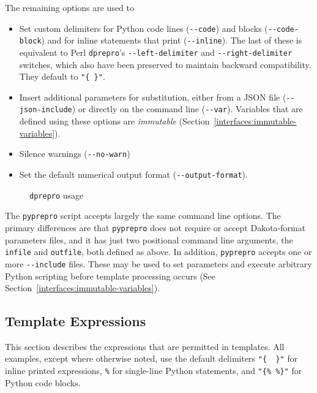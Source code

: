 {The remaining options are used to
\begin{itemize}
  \item Set custom delimiters for Python code lines (\texttt{-\/-code}) and blocks 
    (\texttt{-\/-code-block}) and for inline statements that print 
    (\texttt{-\/-inline}). The last of these is equivalent to Perl \texttt{dprepro}'s 
    \texttt{-\/-left-delimiter} and \texttt{-\/-right-delimiter} switches, which also
    have been preserved to maintain backward compatibility. They default to 
    \texttt{"\{ \}"}.
  \item Insert additional parameters for substitution, either from a JSON file
   (\texttt{-\/-json-include}) or directly on the command line (\texttt{-\/-var}).
   Variables that are defined using these options are \emph{immutable}
   (Section~\ref{interfaces:immutable-variables}).
  \item Silence warnings (\texttt{-\/-no-warn})
  \item Set the default numerical output format (\texttt{-\/-output-format}).
\end{itemize}

\begin{figure}
  \centering
  \begin{bigbox}
    \begin{tiny}
    \end{tiny}
  \end{bigbox}
  \caption{\texttt{dprepro} usage}
  \label{advint:dprepro_usage}
\end{figure}

The \texttt{pyprepro} script accepts largely the same command line options.
The primary differences are that \texttt{pyprepro} does not require or accept
Dakota-format parameters files, and it has just two positional command line
arguments, the \texttt{infile} and \texttt{outfile}, both defined as above.
In addition, \texttt{pyprepro} accepts one or more \texttt{-\/-include} files.
These may be used to set parameters and execute arbitrary Python scripting 
before template processing occurs (See 
Section~\ref{interfaces:immutable-variables}).

\subsection{Template Expressions}\label{interfaces:template-expressions}

This section describes the expressions that are permitted in templates. All 
examples, except where otherwise noted, use the default delimiters 
\texttt{"\{\ \ \}"} for inline printed expressions, \texttt{\%} for single-line 
Python statements, and \texttt{"\{\%\ \%\}"} for Python code blocks.

}
